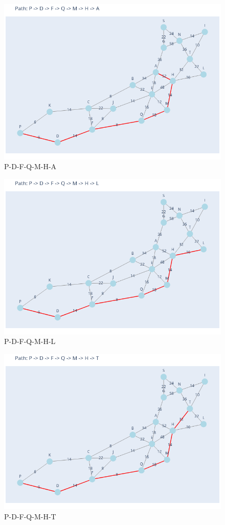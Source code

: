 \documentclass[11pt]{book}
\renewcommand{\=}[1]{\stackrel{#1}{=}} %
\theoremstyle{definition}
\theoremstyle{remark}
\begin{document}
\begin{figure}
    \centering
    \includegraphics[width=0.7\linewidth]{Plots/P_D_F_Q_M_H_A.png}
    \caption{P-D-F-Q-M-H-A}
    \label{fig:enter-label}
\end{figure}
\begin{figure}
    \centering
    \includegraphics[width=0.7\linewidth]{Plots/P_D_F_Q_M_H_L.png}
    \caption{P-D-F-Q-M-H-L}
    \label{fig:enter-label}
\end{figure}
\begin{figure}
    \centering
    \includegraphics[width=0.7\linewidth]{Plots/P_D_F_Q_M_H_T.png}
    \caption{P-D-F-Q-M-H-T}
    \label{fig:enter-label}
\end{figure}
\end{document}

